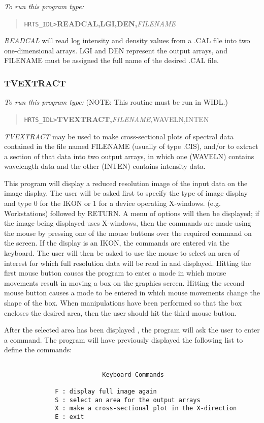 {\em To run this program type:}
\begin{quote}
{\tt HRTS\_IDL>}{\bf READCAL,LGI,DEN,}{\it FILENAME}
\end{quote}
{\em READCAL} will read log intensity and density values from a .CAL file
   into two one-dimensional arrays.  LGI and DEN represent the output
   arrays, and FILENAME must be assigned the full name of the desired .CAL
   file.

\subsubsection{TVEXTRACT}

{\em To run this program type:} (NOTE: This routine must be run in WIDL.)
\begin{quote}
{\tt HRTS\_IDL>}{\bf TVEXTRACT,}{\it FILENAME,}WAVELN,INTEN
\end{quote}
{\em TVEXTRACT} may be used to make cross-sectional plots of spectral data
   contained in the file named FILENAME (usually of type .CIS), and/or to
   extract a section of that data into two output arrays, in which one
   (WAVELN) contains wavelength data and the other (INTEN) contains
   intensity data.

      This program will display a reduced resolution image of the input
   data on the image display. The user will be asked first to specify
   the  type of image display and type 0 for the IKON or 1 for a device
   operating X-windows. (e.g. Workstations) followed by RETURN.
   A menu of options will then be displayed; if the image being
   displayed uses X-windows, then the commands are made using the
   mouse by pressing one of the mouse buttons over the required
   command on the screen. If the display is an IKON, the commands are
   entered via the keyboard.
   The user will then be asked to use the mouse to select
   an area of interest for which full resolution data will be read in and
   displayed.  Hitting the first mouse button causes the program to enter a
   mode in which mouse movements result in moving a box on the graphics
   screen.  Hitting the second mouse button causes a mode to be entered in
   which mouse movements change the shape of the box.  When manipulations
   have been performed so that the box encloses the desired area, then the
   user should hit the third mouse button.

      After the selected area has been displayed , the program
   will ask the user to enter a  command.  The program will have
   previously displayed the following list to define the
   commands:
\begin{verbatim}

                           Keyboard Commands

              F : display full image again
              S : select an area for the output arrays
              X : make a cross-sectional plot in the X-direction
              E : exit
\end{verbatim}

